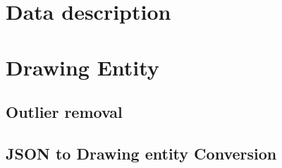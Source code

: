 \begin{comment}

Keywords:

    - [x, y, t, p, a, l]
    - JSON -> Dataframe
    - [x, y, t, p, a, l, stroke number]
    - Pandas Dataframe, effectively store and analyze 
    - Dataframe + Metadata = Drawing Entity
    - Outliers removal 
    
        In statistics, an outlier is an observation point that is distant from other observations. An outlier may be due to variability in the measurement or it may indicate experimental error; the latter are sometimes excluded from the data set.
        
        Our approach was to remove the outlier points by eliminating any points that were above (Mean + 2*SD) and any points below (Mean - 2*SD) before plotting the frequencies
        
        For a random variable vector A made up of N scalar observations, the median absolute deviation (MAD) is defined as

        MAD = median(A
        i
        −median(A))
        for i = 1,2,...,N.
        
        
        For example, isoutlier(A,'mean') returns true for all elements more than three standard deviations from the mean.
        

\end{comment}

\section{Data description}

\section{Drawing Entity}




\subsection{Outlier removal}

\subsection{JSON to Drawing entity Conversion}
